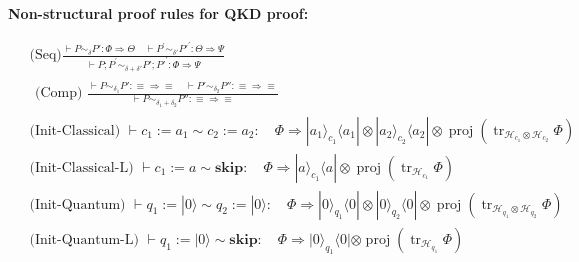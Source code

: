 \documentclass{report}
\newtheorem{definition}{Definition}[section]
\theoremstyle{defn_style}
\begin{document}
\textbf{Non-structural proof rules for QKD proof:}

$\begin{aligned} 
& \text { (Seq)} \frac{\vdash P \sim_\delta P': \Phi \Longrightarrow \Theta \quad \vdash P^{\prime} \sim_{\delta'} P'^{\prime}: \Theta \Longrightarrow \Psi}{\vdash P ; P^{\prime} \sim_{\delta+\delta'} P' ; P'^{\prime}: \Phi \Longrightarrow \Psi}\\
&\begin{gathered}\text { (Comp) } \frac{\vdash P \sim_{\delta_1} P': \equiv \Longrightarrow \equiv \quad \vdash P' \sim_{\delta_2} P'': \equiv \Longrightarrow \equiv}{\vdash P \sim_{\delta_1+\delta_2} P'': \equiv \Longrightarrow \equiv}\end{gathered}\\
&\text{ (Init-Classical) } \vdash c_1:=a_1 \sim c_2:=a_2: \quad \Phi \Longrightarrow  |a_1\rangle_{c_1}\langle a_1| \otimes|a_2\rangle_{c_2}\langle a_2| \otimes \operatorname{proj}\left(\operatorname{tr}_{\mathcal{H}_{c_1} \otimes \mathcal{H}_{c_2}}\Phi\right) \\ & \text { (Init-Classical-L) } 
\vdash c_1:=a \sim \textbf{skip}: \quad \Phi \Longrightarrow  |a\rangle_{c_1}\langle a| \otimes \operatorname{proj}\left(\operatorname{tr}_{\mathcal{H}_{c_1} }\Phi\right)\\
&\text { ({Init-Quantum}) } \vdash q_1:=|0\rangle \sim q_2:=|0\rangle: \quad \Phi \Longrightarrow  |0\rangle_{q_1}\langle 0| \otimes|0\rangle_{q_2}\langle 0| \otimes \operatorname{proj}\left(\operatorname{tr}_{\mathcal{H}_{q_1} \otimes \mathcal{H}_{q_2}}\Phi\right) \\ & \text { ({Init-Quantum-L}) } 
\vdash q_1:=|0\rangle \sim \textbf{skip}: \quad \Phi \Longrightarrow  |0\rangle_{q_1}\langle 0| \otimes \operatorname{proj}\left(\operatorname{tr}_{\mathcal{H}_{q_1} }\Phi\right) \\
\end{aligned}$


\end{document}
